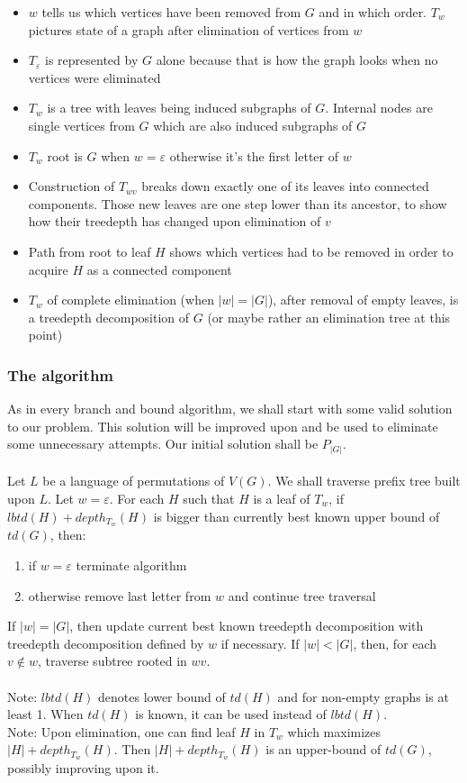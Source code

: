 \begin{itemize}
	\item $w$ tells us which vertices have been removed from $G$ and in which order. $T_w$ pictures state of a graph after elimination of vertices from $w$
	\item $T_\varepsilon$ is represented by $G$ alone because that is how the graph looks when no vertices were eliminated
	\item $T_w$ is a tree with leaves being induced subgraphs of $G$. Internal nodes are single vertices from $G$ which are also induced subgraphs of $G$
	\item $T_w$ root is $G$ when $w=\varepsilon$ otherwise it's the first letter of $w$
	\item Construction of $T_{wv}$ breaks down exactly one of its leaves into connected components. Those new leaves are one step lower than its ancestor, to show how their treedepth has changed upon elimination of $v$
	\item Path from  root to leaf $H$ shows which vertices had to be removed in order to acquire $H$ as a connected component
	\item $T_w$ of complete elimination (when $\left|w\right|=\left|G\right|$), after removal of empty leaves, is a treedepth decomposition of $G$ (or maybe rather an elimination tree at this point)
\end{itemize}
\subsubsection{The algorithm}
As in every branch and bound algorithm, we shall start with some valid solution to our problem. This solution will be improved upon and be used to eliminate some unnecessary attempts. Our initial solution shall be $P_{\left|G\right|}$.\\\\
Let $L$ be a language of permutations of $V\left(G\right)$. We shall traverse prefix tree built upon $L$.
Let $w=\varepsilon$. For each $H$ such that $H$ is a leaf of $T_w$, if $lbtd(H)+depth_{T_w}(H)$ is bigger than currently best known upper bound of $td(G)$, then:
\begin{enumerate}
	\item if $w=\varepsilon$ terminate algorithm
	\item otherwise remove last letter from $w$ and continue tree traversal
\end{enumerate} If $|w|=|G|$, then update current best known treedepth decomposition with treedepth decomposition defined by $w$ if necessary. If $|w|<|G|$, then, for each $v\notin w$, traverse subtree rooted in $wv$.\\\\
Note: $lbtd(H)$ denotes lower bound of $td\left(H\right)$ and for non-empty graphs is at least 1. When $td\left(H\right)$ is known, it can be used instead of $lbtd(H)$.\\
Note: Upon elimination, one can find leaf $H$ in $T_w$ which maximizes $\left|H\right| + depth_{T_w}(H)$. Then $\left|H\right| + depth_{T_w}(H)$ is an upper-bound of $td(G)$, possibly improving upon it.
